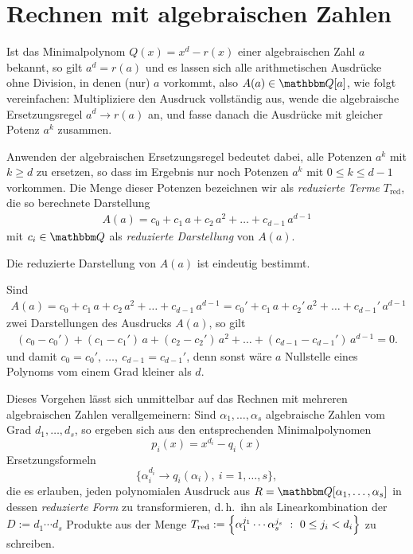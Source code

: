 \documentclass[11pt,a4paper]{article}
\newcommand{\red}{\mathrm{red}}
\begin{document}
\section{Rechnen mit algebraischen Zahlen}

Ist das Minimalpolynom $Q(x)=x^d-r(x)$ einer algebraischen Zahl $a$ bekannt, so
gilt $a^d=r(a)$ und es lassen sich alle arithmetischen Ausdrücke ohne Division,
in denen (nur) $a$ vorkommt, also $A(a)\in\Q[a]$, wie folgt vereinfachen:
Multipliziere den Ausdruck vollständig aus, wende die algebraische
Ersetzungsregel $a^d\to r(a)$ an, und fasse danach die Ausdrücke mit gleicher
Potenz $a^k$ zusammen.

Anwenden der algebraischen Ersetzungsregel bedeutet dabei, alle Potenzen $a^k$
mit $k\ge d$ zu ersetzen, so dass im Ergebnis nur noch Potenzen $a^k$ mit $0\le
k\le d-1$ vorkommen.  Die Menge dieser Potenzen bezeichnen wir als
\emph{reduzierte Terme} $T_{\red}$, die so berechnete Darstellung 
\begin{gather*}
  A(a)=c_0+c_1\,a+c_2\,a^2+\dots+c_{d-1}\,a^{d-1}
\end{gather*}
mit $c_i\in\Q$ als \emph{reduzierte Darstellung} von $A(a)$.

\begin{satz}
  Die reduzierte Darstellung von $A(a)$ ist eindeutig bestimmt.
\end{satz}
\begin{beweis}
  Sind 
\begin{gather*}
  A(a)=c_0+c_1\,a+c_2\,a^2+\dots+c_{d-1}\,a^{d-1}=c_0'+c_1\,a+c_2'\,a^2+\dots+c_{d-1}'\,a^{d-1}
\end{gather*}
zwei Darstellungen des Ausdrucks $A(a)$, so gilt 
\begin{gather*}
  (c_0-c_0')+(c_1-c_1')\,a+(c_2-c_2')\,a^2+\dots+(c_{d-1}-c_{d-1}')\,a^{d-1}=0.
\end{gather*}
und damit $c_0=c_0',\ \dots,\ c_{d-1}=c_{d-1}'$, denn sonst wäre $a$ Nullstelle
eines Polynoms vom einem Grad kleiner als $d$.
\end{beweis}

Dieses Vorgehen lässt sich unmittelbar auf das Rechnen mit mehreren
algebraischen Zahlen verallgemeinern: Sind $\alpha_1,\ldots,\alpha_s$
algebraische Zahlen vom Grad $d_1,\ldots,d_s$, so ergeben sich aus den
entsprechenden Minimalpolynomen
\[p_i(x)=x^{d_i}-q_i(x)\]
Ersetzungsformeln 
\[\{\alpha_i^{d_i}\to q_i(\alpha_i),\ i=1,\ldots,s\},\] 
die es erlauben, jeden polynomialen Ausdruck aus $R=
\Q[\alpha_1,\ldots,\alpha_s]$ in dessen \emph{reduzierte Form} zu
transformieren, d.\,h.\ ihn als Linearkombination der $D:=d_1\cdots d_s$
Produkte aus der Menge $T_{\red} := \cbr{ \alpha_1^{j_1} \cdots
  \alpha_s^{j_s}\ : \ 0 \leq j_i<d_i}$ zu schreiben.
\end{document}
